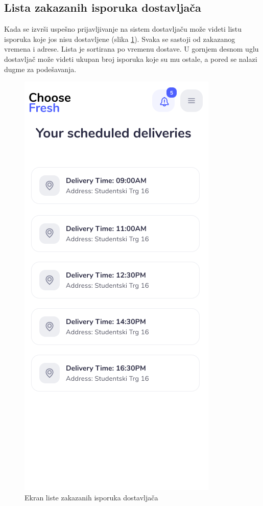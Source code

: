 \subsection{Lista zakazanih isporuka dostavljača}

Kada se izvrši uspešno prijavljivanje na sistem dostavljaču može videti listu isporuka koje jos nisu dostavljene (slika \ref{fig:DeliverymanList}). Svaka se sastoji od zakazanog vremena i adrese. Lista je sortirana po vremenu dostave. U gornjem desnom uglu dostavljač može videti ukupan broj isporuka koje su mu ostale, a pored se nalazi dugme za podešavanja. 


\begin{figure}[H]
	\begin{center}
		\includegraphics[scale=0.3]{UI/deliveryman_list_of_packages.png}
    		\caption{Ekran liste zakazanih isporuka dostavljača}
    \label{fig:DeliverymanList}
    \end{center}
\end{figure}